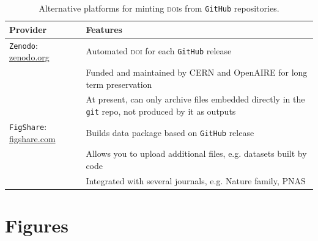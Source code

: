 \documentclass[a4paper,11pt]{article}
\newcommand{\smurl}[1]{{\footnotesize\url{#1}}}
\begin{document}
\newpage

\newpage


\begin{table}[h!]
\centering
\caption{Alternative platforms for minting \textsc{doi}s from \texttt{GitHub} repositories.}
{\footnotesize
\vspace{1cm}
  \begin{tabular}{p{4cm}p{8cm}}
  \hline
  \textbf{Provider} & \textbf{Features} \\ \hline
  \texttt{Zenodo}: \smurl{zenodo.org} & Automated \textsc{doi} for each \texttt{GitHub} release \\
    & Funded and maintained by CERN and OpenAIRE for long term preservation \\
    & At present, can only archive files embedded directly in the \texttt{git} repo, not produced by it as outputs\\
  \texttt{FigShare}: \smurl{figshare.com} & Builds data package based on \texttt{GitHub} release \\
    & Allows you to upload additional files, e.g. datasets built by code \\
    & Integrated with several journals, e.g. Nature family, \textsc{PNAS} \\
  \hline
  \end{tabular}
  }
\label{tab:doi_minting}
\end{table}

\newpage

\section{Figures}
\end{document}
